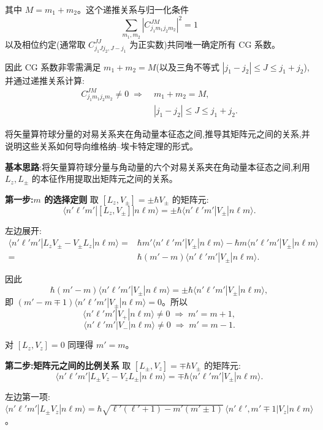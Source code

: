 \begin{question}
\begin{solution}
	其中 $M=m_1+m_2$。这个递推关系与归一化条件
	\[
	\sum_{m_1,m_2}|C^{JM}_{j_1m_1j_2m_2}|^2 = 1
	\]
	以及相位约定(通常取 $C^{JJ}_{j_1Jj_2,J-j_1}$ 为正实数)共同唯一确定所有 CG 系数。

	因此 CG 系数非零需满足 $m_1+m_2=M$(以及三角不等式 $|j_1-j_2|\le J\le j_1+j_2$),并通过递推关系计算:
	\[
	\boxed{\begin{aligned}C^{JM}_{j_1m_1j_2m_2}\neq0\;\Longrightarrow\;&m_1+m_2=M,\\&|j_1-j_2|\le J\le j_1+j_2.\end{aligned}}
	\]
	\end{solution}
\end{question}

\begin{question}
将矢量算符球分量的对易关系夹在角动量本征态之间,推导其矩阵元之间的关系,并说明这些关系如何导向维格纳--埃卡特定理的形式。
\begin{solution}
	\textbf{基本思路}:将矢量算符球分量与角动量的六个对易关系夹在角动量本征态之间,利用 $L_z,L_\pm$ 的本征作用提取出矩阵元之间的关系。

	\textbf{第一步:$m$ 的选择定则} 取 $[L_z,V_\pm]=\pm\hbar V_\pm$ 的矩阵元:
	\[
	\langle n'\ell'm'|[L_z,V_\pm]|n\ell m\rangle = \pm\hbar\langle n'\ell'm'|V_\pm|n\ell m\rangle.
	\]

	左边展开:
	\[
	\begin{aligned}
	\langle n'\ell'm'|L_zV_\pm - V_\pm L_z|n\ell m\rangle={}&
	\hbar m'\langle n'\ell'm'|V_\pm|n\ell m\rangle-\hbar m\langle n'\ell'm'|V_\pm|n\ell m\rangle\\
	={}&\hbar(m'-m)\langle n'\ell'm'|V_\pm|n\ell m\rangle.
	\end{aligned}
	\]

	因此
	\[
	\hbar(m'-m)\langle n'\ell'm'|V_\pm|n\ell m\rangle = \pm\hbar\langle n'\ell'm'|V_\pm|n\ell m\rangle,
	\]
	即 $(m'-m\mp1)\langle n'\ell'm'|V_\pm|n\ell m\rangle=0$。所以
	\[
	\langle n'\ell'm'|V_+|n\ell m\rangle \neq 0 \;\Longrightarrow\; m' = m+1,
	\]
	\[
	\langle n'\ell'm'|V_-|n\ell m\rangle \neq 0 \;\Longrightarrow\; m' = m-1.
	\]

	对 $[L_z,V_z]=0$ 同理得 $m'=m$。

	\textbf{第二步:矩阵元之间的比例关系} 取 $[L_\pm,V_z]=\mp\hbar V_\pm$ 的矩阵元:
	\[
	\langle n'\ell'm'|L_\pm V_z - V_z L_\pm|n\ell m\rangle = \mp\hbar\langle n'\ell'm'|V_\pm|n\ell m\rangle.
	\]

	左边第一项:$\langle n'\ell'm'|L_\pm V_z|n\ell m\rangle
	= \hbar\sqrt{\ell'(\ell'+1)-m'(m'\pm1)}\,\langle n'\ell',m'\mp1|V_z|n\ell m\rangle$。


\end{solution}
\end{question}
